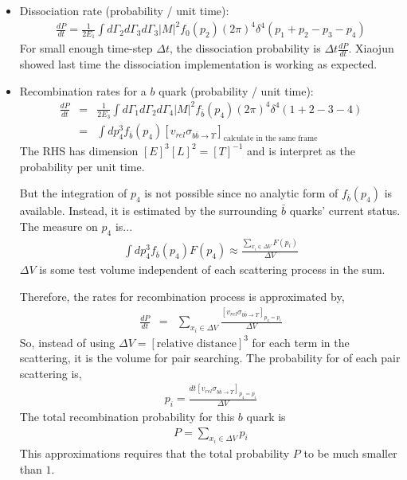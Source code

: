 \documentclass[10pt,a4paper]{article}
\begin{document}
\begin{itemize}
\item Dissociation rate (probability / unit time):
\begin{eqnarray}
\frac{d P}{d t} = \frac{1}{2E_1}\int d\Gamma_2 d\Gamma_3 d\Gamma_3 |M|^2 f_0(p_2)  (2\pi)^4  \delta^4(p_1+p_2-p_3-p_4) 
\end{eqnarray}
For small enough time-step $\Delta t$, the dissociation probability is $\Delta t \frac{dP}{dt}$. Xiaojun showed last time the dissociation implementation is working as expected.

\item Recombination rates for a $b$ quark (probability / unit time):
\begin{eqnarray}
\frac{d P}{d t} &=& \frac{1}{2 E_3}\int d\Gamma_1 d\Gamma_2 d\Gamma_4 |M|^2 f_{\bar{b}}(p_4) (2\pi)^4  \delta^4(1+2-3-4) \\
&=& \int d p_4^3 f_{\bar{b}}(p_4) [v_{rel}  \sigma_{b\bar{b}\rightarrow \Upsilon}]_{\textrm{calculate in the same frame}}
\end{eqnarray}
The RHS has dimension $[E]^3[L]^2 = [T]^{-1}$ and is interpret as the probability per unit time.

But the integration of $p_4$ is not possible since no analytic form of $f_{\bar{b}}(p_4)$ is available. 
Instead, it is estimated by the surrounding $\bar{b}$ quarks' current status.
The measure on $p_4$ is...
\begin{eqnarray}
\int dp_4^3f_{\bar{b}}(p_4) F(p_4)  \approx \frac{\sum_{x_i \in \Delta V} F(p_i)}{\Delta V}
\end{eqnarray}
$\Delta V$ is some test volume independent of each scattering process in the sum.

Therefore, the rates for recombination process is approximated by,
\begin{eqnarray}
\frac{d P}{d t} &=& \sum_{x_i \in \Delta V}\frac{ [v_{rel}  \sigma_{b\bar{b}\rightarrow \Upsilon}]_{p_4 = p_i} }{\Delta V}
\end{eqnarray}
So, instead of using $\Delta V = [\textrm{relative distance}]^3$ for each term in the scattering, it is the volume for pair searching. 
The probability for of each pair scattering is,
\begin{eqnarray}
p_i = \frac{ dt [v_{rel}  \sigma_{b\bar{b}\rightarrow \Upsilon}]_{p_4 = p_i} }{\Delta V}
\end{eqnarray}
The total recombination probability for this $b$ quark is 
\begin{eqnarray}
P = \sum_{x_i \in \Delta V} p_i
\end{eqnarray}
This approximations requires that the total probability $P$  to be much smaller than $1$.
\end{itemize}
\end{document}

